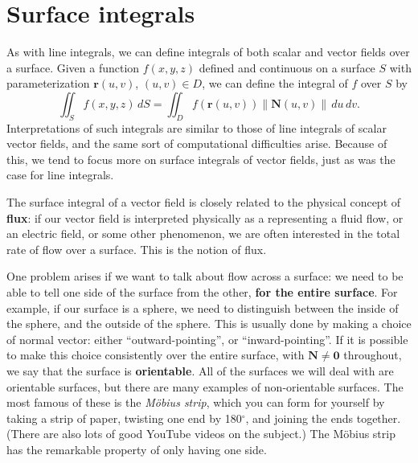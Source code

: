 \documentclass[12pt,letterpaper]{article}
\renewcommand{\r}{\mathbf{r}}
\newcommand{\N}{\mathbf{N}}
\newcommand{\len}[1]{\left\lVert #1\right\rVert}
\begin{document}
\section{Surface integrals}
As with line integrals, we can define integrals of both scalar and vector fields over a surface. Given a function $f(x,y,z)$ defined and continuous on a surface $S$ with parameterization $\r(u,v)$, $(u,v)\in D$, we can define the integral of $f$ over $S$ by
\[
 \iint_S f(x,y,z)\,dS = \iint_D f(\r(u,v))\len{\N(u,v)}\,du\,dv.
\]
Interpretations of such integrals are similar to those of line integrals of scalar vector fields, and the same sort of computational difficulties arise. Because of this, we tend to focus more on surface integrals of vector fields, just as was the case for line integrals.

The surface integral of a vector field is closely related to the physical concept of \textbf{flux}: if our vector field is interpreted physically as a representing a fluid flow, or an electric field, or some other phenomenon, we are often interested in the total rate of flow over a surface. This is the notion of flux.

One problem arises if we want to talk about flow across a surface: we need to be able to tell one side of the surface from the other, \textbf{for the entire surface}. For example, if our surface is a sphere, we need to distinguish between the inside of the sphere, and the outside of the sphere. This is usually done by making a choice of normal vector: either ``outward-pointing'', or ``inward-pointing''. If it is possible to make this choice consistently over the entire surface, with $\N\neq \mathbf{0}$ throughout, we say that the surface is \textbf{orientable}. All of the surfaces we will deal with are orientable surfaces, but there are many examples of non-orientable surfaces. The most famous of these is the \textit{M\"obius strip}, which you can form for yourself by taking a strip of paper, twisting one end by 180$^\circ$, and joining the ends together. (There are also lots of good YouTube videos on the subject.) The M\"obius strip has the remarkable property of only having one side.
\end{document}
